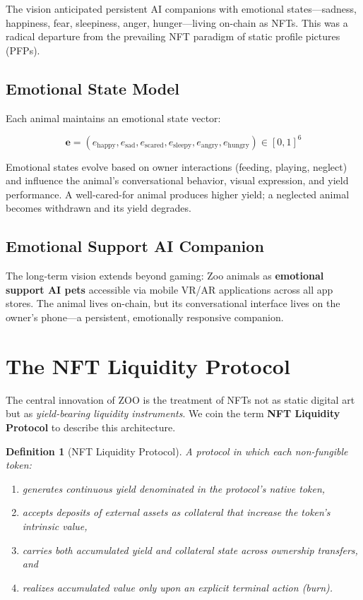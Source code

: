 \documentclass[11pt,letterpaper]{article}
\newtheorem{definition}{Definition}[section]
\begin{document}
The vision anticipated persistent AI companions with emotional states---sadness, happiness, fear, sleepiness, anger, hunger---living on-chain as NFTs.  This was a radical departure from the prevailing NFT paradigm of static profile pictures (PFPs).

\subsection{Emotional State Model}

Each animal maintains an emotional state vector:

\begin{equation}
\mathbf{e} = (e_{\text{happy}}, e_{\text{sad}}, e_{\text{scared}}, e_{\text{sleepy}}, e_{\text{angry}}, e_{\text{hungry}}) \in [0, 1]^6
\label{eq:emotion-vector}
\end{equation}

Emotional states evolve based on owner interactions (feeding, playing, neglect) and influence the animal's conversational behavior, visual expression, and yield performance.  A well-cared-for animal produces higher yield; a neglected animal becomes withdrawn and its yield degrades.

\subsection{Emotional Support AI Companion}

The long-term vision extends beyond gaming: Zoo animals as \textbf{emotional support AI pets} accessible via mobile VR/AR applications across all app stores.  The animal lives on-chain, but its conversational interface lives on the owner's phone---a persistent, emotionally responsive companion.

\section{The NFT Liquidity Protocol}
\label{sec:protocol}

The central innovation of ZOO is the treatment of NFTs not as static digital art but as
\emph{yield-bearing liquidity instruments}.  We coin the term \textbf{NFT Liquidity Protocol}
to describe this architecture.

\begin{definition}[NFT Liquidity Protocol]
A protocol in which each non-fungible token:
\begin{enumerate}
    \item generates continuous yield denominated in the protocol's native token,
    \item accepts deposits of external assets as collateral that increase the token's
          intrinsic value,
    \item carries both accumulated yield and collateral state across ownership transfers, and
    \item realizes accumulated value only upon an explicit terminal action (burn).
\end{enumerate}
\end{definition}
\end{document}
